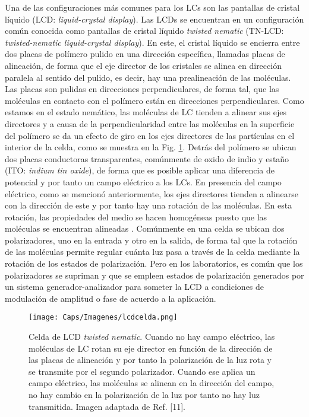 Una de las configuraciones más comunes para los LCs son las pantallas de cristal líquido (LCD: \textit{liquid-crystal display}). Las LCDs se encuentran en un configuración común conocida como pantallas de cristal líquido \textit{twisted nematic} (TN-LCD: \textit{twisted-nematic liquid-crystal display}). En este, el cristal líquido se encierra entre dos placas de polímero pulido en una dirección específica, llamadas placas de alineación, de forma que el eje director de los cristales se alinea en dirección paralela al sentido del pulido, es decir, hay una prealineación de las moléculas. Las placas son pulidas en direcciones perpendiculares, de forma tal, que las moléculas en contacto con el polímero están en direcciones perpendiculares. Como estamos en el estado nemático, las moléculas de LC tienden a alinear sus ejes directores y a causa de la perpendicularidad entre las moléculas en la superficie del polímero se da un efecto de giro en los ejes directores de las partículas en el interior de la celda, como se muestra en la Fig. \ref{fig:lcd}. Detrás del polímero se ubican dos placas conductoras  transparentes, comúnmente de oxido de indio y estaño (ITO: \textit{indium tin oxide}), de forma que es posible aplicar una diferencia de potencial y por tanto un campo eléctrico a los LCs. En presencia del campo eléctrico, como se mencionó anteriormente, los ejes directores tienden a alinearse con la dirección de este y por tanto hay una rotación de las moléculas. En esta rotación, las propiedades del medio se hacen homogéneas puesto que las moléculas se encuentran alineadas \cite{Uribe2011, Burman2010}. Comúnmente en una celda se ubican dos polarizadores, uno en la entrada y otro en la salida, de forma tal que la rotación de las moléculas permite regular cuánta luz pasa a través de la celda mediante la rotación de los estados de polarización. Pero en los laboratorios, es común que los polarizadores se supriman y que se empleen estados de polarización generados por un sistema generador-analizador para someter la LCD a condiciones de modulación de amplitud o fase de acuerdo a la aplicación.

\begin{figure}[!ht]
  \centering
    \texttt{[image: Caps/Imagenes/lcdcelda.png]}
  \caption[Celda de LCD \textit{twisted nematic}]{Celda de LCD \textit{twisted nematic}. Cuando no hay campo eléctrico, las moléculas de LC rotan su eje director en función de la dirección de las placas de alineación y por tanto la polarización de la luz rota y se transmite por el segundo polarizador. Cuando ese aplica un campo eléctrico, las moléculas se alinean en la dirección del campo, no hay cambio en la polarización de la luz por tanto no hay luz transmitida. Imagen adaptada de Ref. [11].}
  \label{fig:lcd}
\end{figure}

